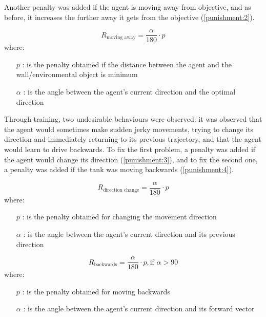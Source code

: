 Another penalty was added if the agent is moving away from objective, and as before, it increases the further away it gets from the objective (\ref{punishment:2}). 

\begin{equation} \label{punishment:2}
    R_\text{moving away} = \frac{\alpha}{180} \cdot p
\end{equation}
where:
\begin{itemize}
    \item [$p$]: is the penalty obtained if the distance between the agent and the wall/environmental object is minimum
    \item [$\alpha$]: is the angle between the agent's current direction and the optimal direction
\end{itemize}

Through training, two undesirable behaviours were observed: it was observed that the agent would sometimes make sudden jerky movements, trying to change its direction and immediately returning to its previous trajectory, and that the agent would learn to drive backwards. To fix the first problem, a penalty was added if the agent would change its direction (\ref{punishment:3}), and to fix the second one, a penalty was added if the tank was moving backwards (\ref{punishment:4}).

\begin{equation} \label{punishment:3}
    R_\text{direction change} = \frac{\alpha}{180} \cdot p
\end{equation}
where:
\begin{itemize}
    \item [$p$]: is the penalty obtained for changing the movement direction
    \item [$\alpha$]: is the angle between the agent's current direction and its previous direction
\end{itemize}

\begin{equation} \label{punishment:4}
    R_\text{backwards} = \frac{\alpha}{180} \cdot p, \text{if } \alpha > 90
\end{equation}
where:
\begin{itemize}
    \item [$p$]: is the penalty obtained for moving backwards
    \item [$\alpha$]: is the angle between the agent's current direction and its forward vector
\end{itemize}

